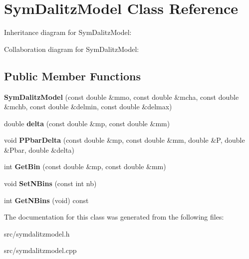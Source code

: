 \hypertarget{class_sym_dalitz_model}{}\section{Sym\+Dalitz\+Model Class Reference}
\label{class_sym_dalitz_model}


Inheritance diagram for Sym\+Dalitz\+Model\+:


Collaboration diagram for Sym\+Dalitz\+Model\+:
\subsection*{Public Member Functions}
\begin{DoxyCompactItemize}
\item 
\hypertarget{class_sym_dalitz_model_a7a120e7daee8661fe1ea72aca966e401}{}{\bfseries Sym\+Dalitz\+Model} (const double \&mmo, const double \&mcha, const double \&mchb, const double \&delmin, const double \&delmax)\label{class_sym_dalitz_model_a7a120e7daee8661fe1ea72aca966e401}

\item 
\hypertarget{class_sym_dalitz_model_adaf2729f419434bc3b7370e28ff41479}{}double {\bfseries delta} (const double \&mp, const double \&mm)\label{class_sym_dalitz_model_adaf2729f419434bc3b7370e28ff41479}

\item 
\hypertarget{class_sym_dalitz_model_a39bcae93339503e293485cd6821b13b2}{}void {\bfseries P\+Pbar\+Delta} (const double \&mp, const double \&mm, double \&P, double \&Pbar, double \&delta)\label{class_sym_dalitz_model_a39bcae93339503e293485cd6821b13b2}

\item 
\hypertarget{class_sym_dalitz_model_a9d653adee59644753e26e2aef11db2c2}{}int {\bfseries Get\+Bin} (const double \&mp, const double \&mm)\label{class_sym_dalitz_model_a9d653adee59644753e26e2aef11db2c2}

\item 
\hypertarget{class_sym_dalitz_model_ae46938f299d827bd7398b1857861a65a}{}void {\bfseries Set\+N\+Bins} (const int nb)\label{class_sym_dalitz_model_ae46938f299d827bd7398b1857861a65a}

\item 
\hypertarget{class_sym_dalitz_model_ad3564da54b36384f534c03edb7dec55d}{}int {\bfseries Get\+N\+Bins} (void) const \label{class_sym_dalitz_model_ad3564da54b36384f534c03edb7dec55d}

\end{DoxyCompactItemize}


The documentation for this class was generated from the following files\+:\begin{DoxyCompactItemize}
\item 
src/symdalitzmodel.\+h\item 
src/symdalitzmodel.\+cpp\end{DoxyCompactItemize}
